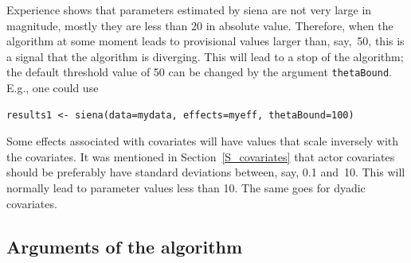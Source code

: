 \documentclass[a4paper,fleqn,11pt]{article}
\newcommand{\+}{\, + \,}
\newcommand{\sfn}[1]{\textsf{#1}}
\begin{document}
Experience shows that parameters estimated by \sfn{siena} are
not very large in magnitude, mostly they are less than 20 in
absolute value. Therefore, when the algorithm at some moment leads to
provisional values larger than, say,~50, this is a signal that the
algorithm is diverging. This will lead to a stop of the algorithm;
the default threshold value of 50 can be changed by the argument
\texttt{thetaBound}. E.g., one could use
\begin{verbatim}
results1 <- siena(data=mydata, effects=myeff, thetaBound=100)
\end{verbatim}
Some effects associated with covariates will have values that scale
inversely with the covariates.
It was mentioned in Section~\ref{S_covariates} that actor
covariates should be preferably have standard deviations between, say,
0.1 and~10. This will normally lead to parameter values less than 10.
The same goes for dyadic covariates.

\subsection{Arguments of the algorithm}
\label{S_param}
\end{document}
